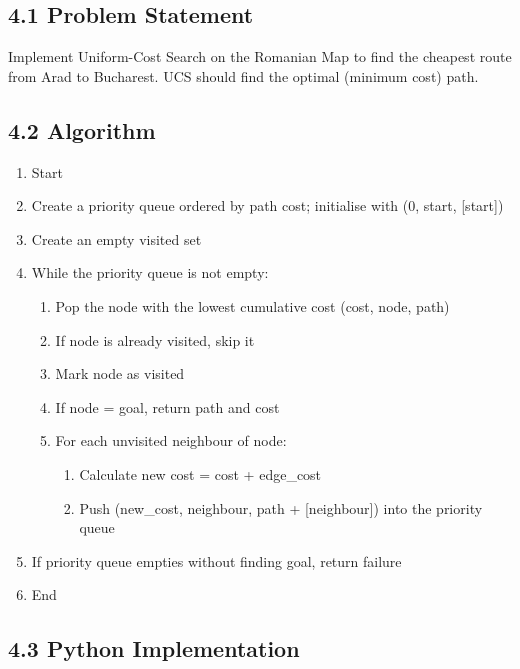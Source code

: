 \documentclass[12pt,a4paper]{article}
\begin{document}
\subsection*{4.1 Problem Statement}

Implement Uniform-Cost Search on the Romanian Map to find the cheapest route from Arad to Bucharest. UCS should find the optimal (minimum cost) path.

\subsection*{4.2 Algorithm}

\begin{enumerate}[leftmargin=1.6em]
  \item Start
  \item Create a priority queue ordered by path cost; initialise with (0, start, [start])
  \item Create an empty visited set
  \item While the priority queue is not empty:
  \begin{enumerate}[leftmargin=1.6em,label=(\alph*)]
    \item Pop the node with the lowest cumulative cost (cost, node, path)
    \item If node is already visited, skip it
    \item Mark node as visited
    \item If node = goal, return path and cost
    \item For each unvisited neighbour of node:
    \begin{enumerate}[leftmargin=1.6em,label=\roman*.]
      \item Calculate new cost = cost + edge\_cost
      \item Push (new\_cost, neighbour, path + [neighbour]) into the priority queue
    \end{enumerate}
  \end{enumerate}
  \item If priority queue empties without finding goal, return failure
  \item End
\end{enumerate}

\subsection*{4.3 Python Implementation}
\end{document}

